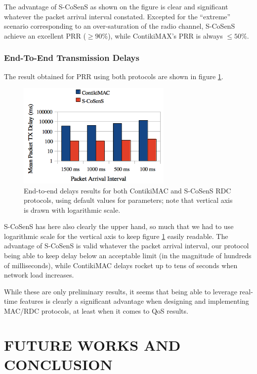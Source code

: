 \documentclass[a4paper,twoside]{article}
\begin{document}
The advantage of S-CoSenS as shown on the figure is clear and significant
whatever the packet arrival interval constated. Excepted for the ``extreme''
scenario corresponding to an over-saturation of the radio channel, S-CoSenS
achieve an excellent PRR ($\geq 90\%$), while ContikiMAX's PRR is always
$\leq 50\%$.

\subsubsection{End-To-End Transmission Delays}

The result obtained for PRR using both protocols are shown in figure
\ref{FigDelaysResults}.

\begin{figure}
  \centering
  \includegraphics[width=7.5cm]{DelaysGraph.png}
  \caption{End-to-end delays results for both ContikiMAC and S-CoSenS RDC
           protocols, using default values for parameters; note that
           vertical axis is drawn with logarithmic scale.}
  \label{FigDelaysResults}
\end{figure}

S-CoSenS has here also clearly the upper hand, so much that we had to use
logarithmic scale for the vertical axis to keep figure \ref{FigDelaysResults}
easily readable. The advantage of S-CoSenS is valid whatever the packet
arrival interval, our protocol being able to keep delay below an acceptable
limit (in the magnitude of hundreds of milliseconds), while ContikiMAC
delays rocket up to tens of seconds when network load increases.

While these are only preliminary results, it seems that being able to
leverage real-time features is clearly a significant advantage when designing
and implementing MAC/RDC protocols, at least when it comes to QoS results.



\section{\uppercase{Future Works and Conclusion}}
\end{document}

